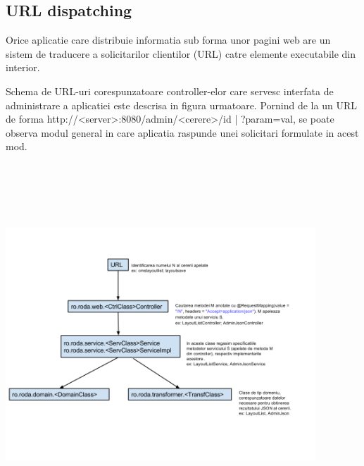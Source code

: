 \subsection{URL dispatching}

Orice aplicatie care distribuie informatia sub forma unor pagini web are un sistem de traducere a solicitarilor clientilor (URL) catre elemente executabile din interior. 

Schema de URL-uri corespunzatoare controller-elor care servesc interfata de administrare a aplicatiei este descrisa in figura urmatoare. Pornind de la un URL de forma http://<server>:8080/admin/<cerere>{/{id} | ?param=val}, se poate observa modul general in care aplicatia raspunde unei solicitari formulate in acest mod.

\bigskip

\begin{center}
\includegraphics[width=4.5866in,height=5.3299in]{roda_URL.png}
\end{center}

\bigskip

